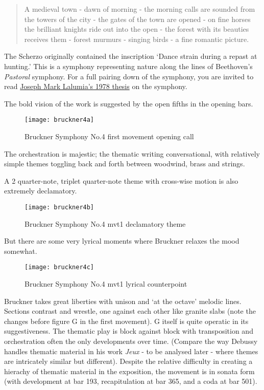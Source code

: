 \begin{quotation}
A medieval town - dawn of morning - the morning calls are sounded from the towers of the city - the gates of the town are opened - on fine horses the brilliant knights ride out into the open - the forest with its beauties receives them - forest murmurs - singing birds - a fine romantic picture. 
\end{quotation}

The Scherzo originally contained the inscription `Dance strain during a repast at hunting.' This is a  symphony representing nature along the lines of Beethoven's \textit{Pastoral} symphony. For a full pairing down of the symphony, you are invited to read \href{https://urresearch.rochester.edu/institutionalPublicationPublicView.action?institutionalItemId=5839}{Joseph Mark Lalumia's 1978 thesis} on the symphony. 

The bold vision of the work is suggested by the open fifths in the opening bars. 

\begin{figure}[H]
\centering
\texttt{[image: bruckner4a]}\caption{Bruckner Symphony No.4 first movement opening call}
\label{fig:bruckner1a}
\end{figure}

The orchestration is majestic; the thematic writing conversational, with relatively simple themes toggling back and forth between woodwind, brass and strings. 


A 2 quarter-note, triplet quarter-note theme with cross-wise motion is also extremely declamatory.

\begin{figure}[H]
\centering
\texttt{[image: bruckner4b]}\caption{Bruckner Symphony No.4 mvt1 declamatory theme}
\label{fig:bruckner1b}
\end{figure}

But there are some very lyrical moments where Bruckner relaxes the mood somewhat. 

\begin{figure}[H]
\centering
\texttt{[image: bruckner4c]}\caption{Bruckner Symphony No.4 mvt1 lyrical counterpoint}
\label{fig:bruckner1c}
\end{figure}

Bruckner takes great liberties with unison and `at the octave' melodic lines. 
Sections contrast and wrestle, one against each other like granite slabs (note the changes before figure G in the first movement). G itself is quite operatic in its suggestiveness. The thematic play is block against block with transposition and orchestration often the only developments over time. (Compare the way Debussy handles thematic material in his work \textit{Jeux} - to be analysed later -  where themes are intricately similar but different). Despite the relative difficulty in creating a hierachy of thematic material in the exposition, the movement is in sonata form (with development at bar 193, recapitulation at bar 365, and a coda at bar 501). 

